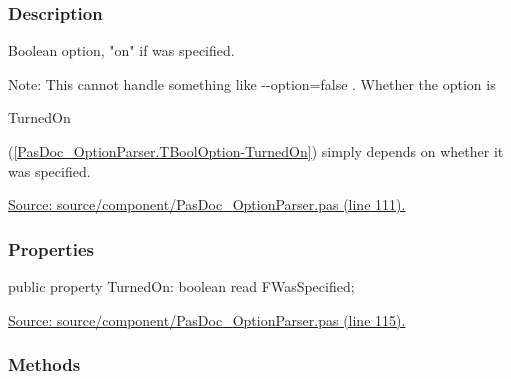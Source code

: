 \documentclass{report}
\newif\ifpdf
\begin{document}
\subsubsection*{\large{\textbf{Description}}\normalsize\hspace{1ex}\hfill}
Boolean option, "on" if was specified.\hfill\vspace*{1ex}



Note: This cannot handle something like {-}{-}option=false . Whether the option is \begin{ttfamily}TurnedOn\end{ttfamily}(\ref{PasDoc_OptionParser.TBoolOption-TurnedOn}) simply depends on whether it was specified.\par
\href{https://github.com/pasdoc/pasdoc/blob/master/source/component/PasDoc_OptionParser.pas#L111}{Source: source/component/PasDoc{\_}OptionParser.pas (line 111).}\subsubsection*{\large{\textbf{Properties}}\normalsize\hspace{1ex}\hfill}
\begin{list}{}{
\setlength{\itemindent}{0cm}
\setlength{\listparindent}{0cm}
\setlength{\leftmargin}{\evensidemargin}
\addtolength{\leftmargin}{\tmplength}
\settowidth{\labelsep}{X}
\addtolength{\leftmargin}{\labelsep}
\setlength{\labelwidth}{\tmplength}
}
\label{PasDoc_OptionParser.TBoolOption-TurnedOn}
\item[\textbf{TurnedOn}\hfill]
\ifpdf
\begin{flushleft}
\fi
\begin{ttfamily}
public property TurnedOn: boolean read FWasSpecified;\end{ttfamily}

\ifpdf
\end{flushleft}
\fi


\par  \par
\href{https://github.com/pasdoc/pasdoc/blob/master/source/component/PasDoc_OptionParser.pas#L115}{Source: source/component/PasDoc{\_}OptionParser.pas (line 115).}\end{list}
\subsubsection*{\large{\textbf{Methods}}\normalsize\hspace{1ex}\hfill}
\end{document}
